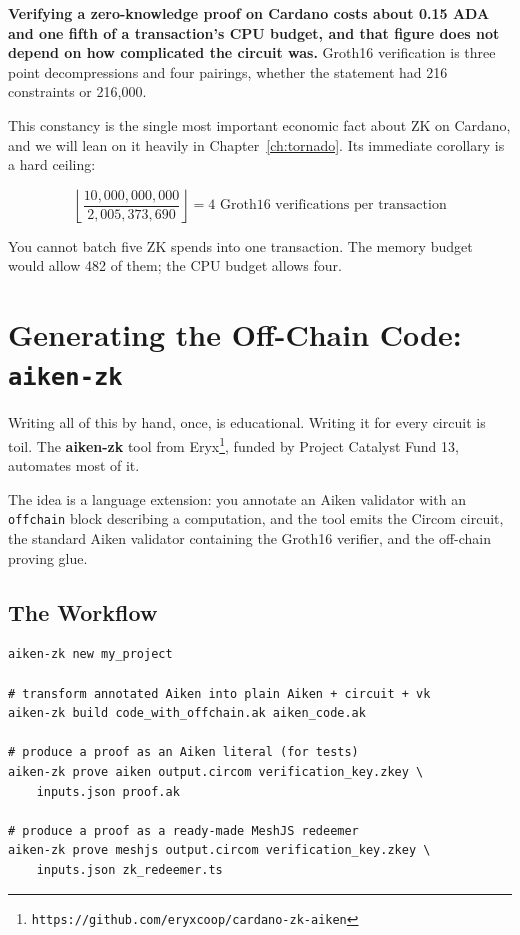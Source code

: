 \begin{highlight}
\textbf{Verifying a zero-knowledge proof on Cardano costs about 0.15 ADA and
one fifth of a transaction's CPU budget, and that figure does not depend on
how complicated the circuit was.} Groth16 verification is three point
decompressions and four pairings, whether the statement had 216 constraints or
216{,}000.
\end{highlight}

This constancy is the single most important economic fact about ZK on Cardano,
and we will lean on it heavily in Chapter~\ref{ch:tornado}. Its immediate
corollary is a hard ceiling:

\[
  \left\lfloor \frac{10{,}000{,}000{,}000}{2{,}005{,}373{,}690} \right\rfloor
  = 4 \text{ Groth16 verifications per transaction}
\]

You cannot batch five ZK spends into one transaction. The memory budget would
allow 482 of them; the CPU budget allows four.

\section{Generating the Off-Chain Code: \texttt{aiken-zk}} \label{sec:ch7-aikenzk}

Writing all of this by hand, once, is educational. Writing it for every circuit
is toil. The \textbf{aiken-zk} tool from
Eryx\footnote{\texttt{https://github.com/eryxcoop/cardano-zk-aiken}}, funded
by Project Catalyst Fund 13, automates most of it.

The idea is a language extension: you annotate an Aiken validator with an
\texttt{offchain} block describing a computation, and the tool emits the Circom
circuit, the standard Aiken validator containing the Groth16 verifier, and the
off-chain proving glue.

\subsection*{The Workflow}

\begin{verbatim}
aiken-zk new my_project

# transform annotated Aiken into plain Aiken + circuit + vk
aiken-zk build code_with_offchain.ak aiken_code.ak

# produce a proof as an Aiken literal (for tests)
aiken-zk prove aiken output.circom verification_key.zkey \
    inputs.json proof.ak

# produce a proof as a ready-made MeshJS redeemer
aiken-zk prove meshjs output.circom verification_key.zkey \
    inputs.json zk_redeemer.ts
\end{verbatim}


